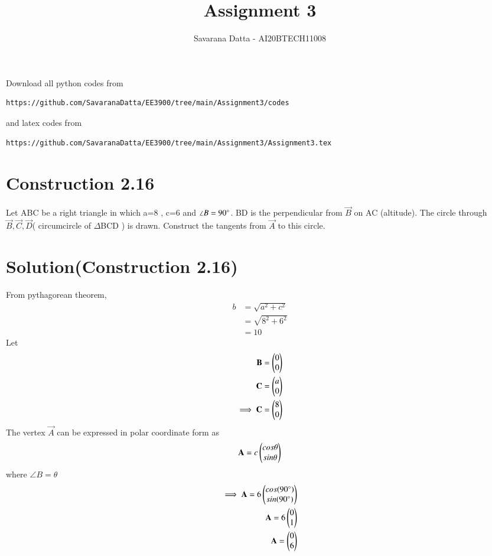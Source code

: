 \documentclass[journal,12pt,twocolumn]{IEEEtran}
\begin{document}
     \def\rightbox#1{\makebox[0in][r]{#1}}
     \def\centbox#1{\makebox[0in]{#1}}
     \def\topbox#1{\raisebox{-\baselineskip}[0in][0in]{#1}}
     \def\midbox#1{\raisebox{-0.5\baselineskip}[0in][0in]{#1}}
\vspace{3cm}
\title{ Assignment 3}
\author{Savarana Datta - AI20BTECH11008}
\maketitle
\newpage
\bigskip
\renewcommand{\thefigure}{\theenumi}
\renewcommand{\thetable}{\theenumi}
Download all python codes from 
\begin{lstlisting}
https://github.com/SavaranaDatta/EE3900/tree/main/Assignment3/codes
\end{lstlisting}
%
and latex codes from 
%
\begin{lstlisting}
https://github.com/SavaranaDatta/EE3900/tree/main/Assignment3/Assignment3.tex
\end{lstlisting}


\section{Construction 2.16}
Let ABC be a right triangle in which a=8 , c=6 and $\angle B = 90 \degree$. BD is the perpendicular from $\vec{B}$ on AC (altitude). The circle through $\vec{B},\vec{C},\vec{D}$( circumcircle of $\Delta$BCD ) is drawn. Construct the tangents from $\vec{A}$ to this circle.

\section{Solution(Construction 2.16)}
From pythagorean theorem,
\begin{align}
    b & = \sqrt{a^2+c^2}\\
      & = \sqrt{8^{2}+6^{2}}\\
      & = 10
\end{align}
Let
\begin{align}
    \mathbf{B} = \begin{pmatrix}0\\0\end{pmatrix}\\
    \mathbf{C} = \begin{pmatrix}a\\0\end{pmatrix}\\
    \implies \mathbf{C}=\begin{pmatrix}8\\0\end{pmatrix}
\end{align}
The vertex $\vec{A}$ can be expressed in polar coordinate form as
\begin{align}
    \mathbf{A} = c\begin{pmatrix}cos\theta\\sin\theta\end{pmatrix}
\end{align}
where $\angle B = \theta$
\begin{align}
    \implies \mathbf{A}=6\begin{pmatrix}cos(90\degree)\\sin(90\degree)\end{pmatrix}\\
    \mathbf{A}=6\begin{pmatrix}0\\1\end{pmatrix}\\
    \mathbf{A}=\begin{pmatrix}0\\6\end{pmatrix}
\end{align}
\end{document}
